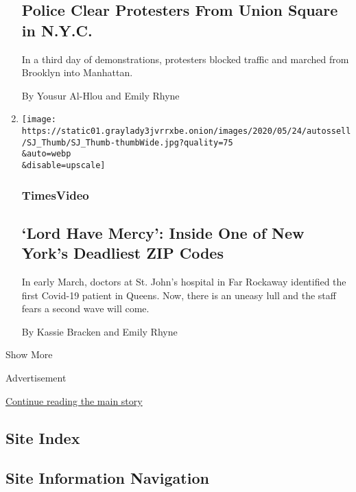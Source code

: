 \begin{enumerate}
  \hypertarget{police-clear-protesters-from-union-square-in-nyc}{%
  \subsection{Police Clear Protesters From Union Square in
  N.Y.C.}\label{police-clear-protesters-from-union-square-in-nyc}}

  In a third day of demonstrations, protesters blocked traffic and
  marched from Brooklyn into Manhattan.

  By Yousur Al-Hlou and Emily Rhyne
\item
  \href{/video/us/100000007097093/coronavirus-st-johns-hospital-far-rockaway.html}{}

  \texttt{[image: https://static01.graylady3jvrrxbe.onion/images/2020/05/24/autossell/SJ\_Thumb/SJ\_Thumb-thumbWide.jpg?quality=75\\\&auto=webp\\\&disable=upscale]}

  \hypertarget{timesvideo-6}{%
  \subsubsection{TimesVideo}\label{timesvideo-6}}

  \hypertarget{lord-have-mercy-inside-one-of-new-yorks-deadliest-zip-codes}{%
  \subsection{`Lord Have Mercy': Inside One of New York's Deadliest ZIP
  Codes}\label{lord-have-mercy-inside-one-of-new-yorks-deadliest-zip-codes}}

  In early March, doctors at St. John's hospital in Far Rockaway
  identified the first Covid-19 patient in Queens. Now, there is an
  uneasy lull and the staff fears a second wave will come.

  By Kassie Bracken and Emily Rhyne
\end{enumerate}

Show More

Advertisement

\protect\hyperlink{after-mid2}{Continue reading the main story}

\hypertarget{site-index}{%
\subsection{Site Index}\label{site-index}}

\hypertarget{site-information-navigation}{%
\subsection{Site Information
Navigation}\label{site-information-navigation}}

